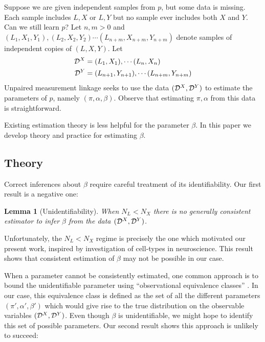 \documentclass{article}
\newtheorem{lemma}[thm]{Lemma}
\theoremstyle{definition}
\begin{document}
Suppose we are given independent samples from $p$, but some data is missing.  Each sample includes $L,X$ or $L,Y$ but no sample ever includes both $X$ and $Y$.  Can we still learn $p$?  Let $n,m>0$ and $(L_1,X_1,Y_1),(L_2,X_2,Y_2) \cdots (L_{n+m},X_{n+m},Y_{n+m})$ denote samples of independent copies of $(L,X,Y)$.  Let
%
\begin{align*}
\mathcal{D}^X &= (L_1,X_1),\cdots (L_n,X_n) \\
\mathcal{D}^Y &= (L_{n+1},Y_{n+1}),\cdots (L_{n+m},Y_{n+m}) 
\end{align*}
%
Unpaired measurement linkage seeks to use the data $(\mathcal{D}^X,\mathcal{D}^Y)$ to estimate the parameters of $p$, namely $(\pi,\alpha,\beta)$.  Observe that estimating $\pi,\alpha$ from this data is straightforward.  

Existing estimation theory is less helpful for the parameter $\beta$.  In this paper we develop theory and practice for estimating $\beta$.

                                                   


\subsection{Theory}

Correct inferences about $\beta$ require careful treatment of its identifiability.  Our first result is a negative one:

\begin{lemma}[Unidentifiability]  \label{lem:unident} When $N_L<N_X$ there is no generally consistent estimator to infer $\beta$ from the data $(\mathcal{D}^X,\mathcal{D}^Y)$.  
\end{lemma}

Unfortunately, the $N_L<N_X$ regime is precisely the one which motivated our present work, inspired by investigation of cell-types in neuroscience.  This result shows that consistent estimation of $\beta$ may not be possible in our case.

When a parameter cannot be consistently estimated, one common approach is to bound the unidentifiable parameter using  ``observational equivalence classes'' \cite{paulino1994identifiability,hauser2012characterization,tong1991indeterminacy}.  In our case, this equivalence class is defined as the set of all the different parameters $(\pi',\alpha',\beta')$ which would give rise to the true distribution on the observable variables $(\mathcal{D}^X,\mathcal{D}^Y)$.  Even though $\beta$ is unidentifiable, we might hope to identify this set of possible parameters.  Our second result shows this approach is unlikely to succeed:
\end{document}
